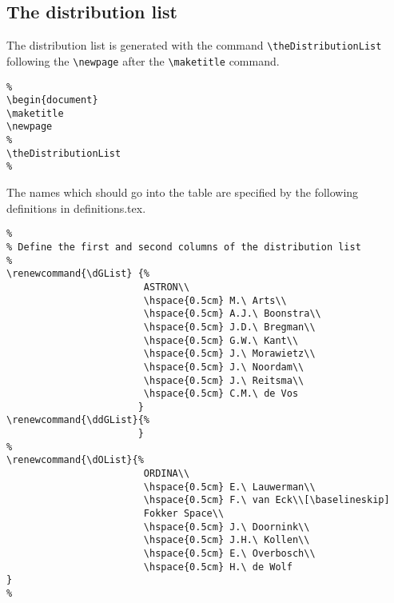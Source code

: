 \documentclass[]{lofar}
\begin{document}
\subsection{The distribution list}

The distribution list is generated with the command 
\verb=\theDistributionList= following the \verb=\newpage= after the
\verb=\maketitle= command.
%
\begin{verbatim}
%
\begin{document}
\maketitle
\newpage
%
\theDistributionList
%
\end{verbatim}
%
The names which should go into the table are specified by the following 
definitions in \textsf{definitions.tex}.
%
\begin{verbatim}
%
% Define the first and second columns of the distribution list
%
\renewcommand{\dGList} {%
                        ASTRON\\
                        \hspace{0.5cm} M.\ Arts\\
                        \hspace{0.5cm} A.J.\ Boonstra\\
                        \hspace{0.5cm} J.D.\ Bregman\\
                        \hspace{0.5cm} G.W.\ Kant\\
                        \hspace{0.5cm} J.\ Morawietz\\
                        \hspace{0.5cm} J.\ Noordam\\
                        \hspace{0.5cm} J.\ Reitsma\\
                        \hspace{0.5cm} C.M.\ de Vos
                       }
\renewcommand{\ddGList}{%
                       }
%
\renewcommand{\dOList}{%
                        ORDINA\\
                        \hspace{0.5cm} E.\ Lauwerman\\
                        \hspace{0.5cm} F.\ van Eck\\[\baselineskip]
                        Fokker Space\\
                        \hspace{0.5cm} J.\ Doornink\\
                        \hspace{0.5cm} J.H.\ Kollen\\
                        \hspace{0.5cm} E.\ Overbosch\\
                        \hspace{0.5cm} H.\ de Wolf
}
%
\end{verbatim}
\end{document}

